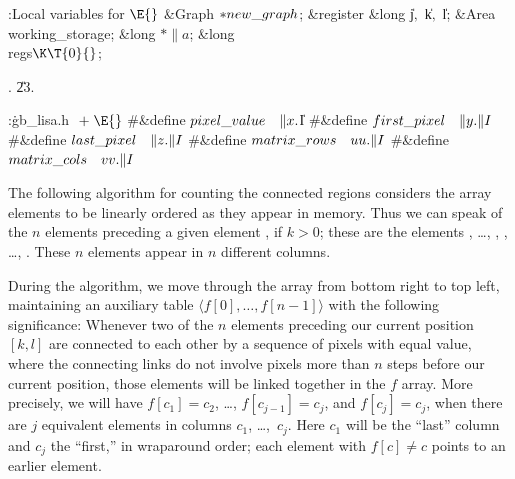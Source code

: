 \B{}:Local variables for \X${}\E{}$\6
\&{Graph} ${}{*}\\{new\_graph}{}$;\6
\&{register} \&{long} \|j${},{}$ \|k${},{}$ \|l;\6
\&{Area} \\{working\_storage};\6
\&{long} ${}{*}\|a{}$;\6
\&{long} \\{regs}${}\K\T{0}{}$;\par
{}.
\U23.\fi

\B{}:\.{gb\_lisa.h }\X${}\mathrel+\E{}$\6
\8\#\&{define} ${}\\{pixel\_value}\hbox{\quad}\|x.{}$\|I\6
\8\#\&{define} ${}\\{first\_pixel}\hbox{\quad}\|y.\|I{}$\6
\8\#\&{define} ${}\\{last\_pixel}\hbox{\quad}\|z.\|I{}$\6
\8\#\&{define} ${}\\{matrix\_rows}\hbox{\quad}\\{uu}.\|I{}$\6
\8\#\&{define} ${}\\{matrix\_cols}\hbox{\quad}\\{vv}.\|I{}$\par
\fi

The following algorithm for counting the connected regions considers
the array elements  to be linearly ordered as they appear
in memory. Thus we can speak of the $n$ elements preceding a given
element , if $k>0$; these are the elements , \dots,
, , \dots, . These $n$ elements appear
in $n$ different columns.

During the algorithm, we move through the array from bottom right
to top left, maintaining an auxiliary table $\langle f[0],\ldots,f[n-1]
\rangle$ with the following significance: Whenever two of the
$n$ elements preceding our current position $[k,l]$ are connected to
each other by a sequence of pixels with equal value, where the connecting
links do not involve pixels more than $n$ steps before our current
position, those elements will be linked together in the $f$ array.
More precisely, we will have $f[c_1]=c_2$, \dots, $f[c_{j-1}]=c_j$,
and $f[c_j]=c_j$, when there are $j$ equivalent elements in columns
$c_1$, \dots,~$c_j$. Here $c_1$ will be the ``last'' column and
$c_j$ the ``first,'' in wraparound order; each element with $f[c]\ne c$
points to an earlier element.

